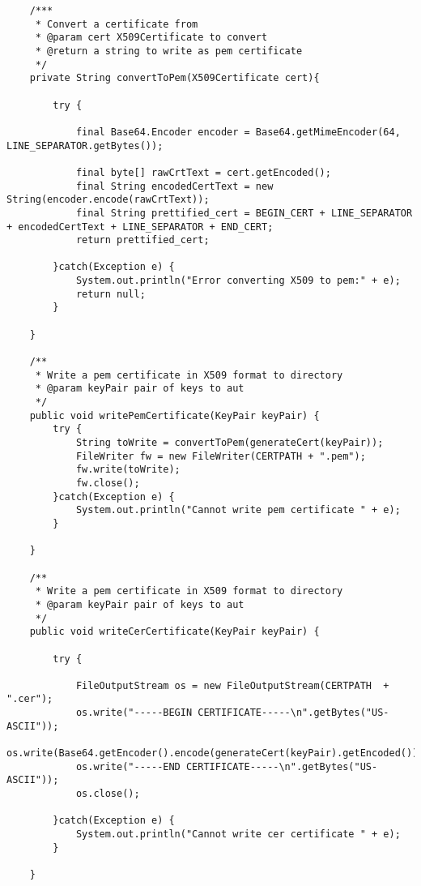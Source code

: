 \documentclass{article}
\begin{document}
\begin{verbatim}
	/***
	 * Convert a certificate from 
	 * @param cert X509Certificate to convert
	 * @return a string to write as pem certificate
	 */
	private String convertToPem(X509Certificate cert){

		try {

			final Base64.Encoder encoder = Base64.getMimeEncoder(64, LINE_SEPARATOR.getBytes());

			final byte[] rawCrtText = cert.getEncoded();
			final String encodedCertText = new String(encoder.encode(rawCrtText));
			final String prettified_cert = BEGIN_CERT + LINE_SEPARATOR + encodedCertText + LINE_SEPARATOR + END_CERT;
			return prettified_cert;
		
		}catch(Exception e) {
			System.out.println("Error converting X509 to pem:" + e);
			return null;
		}

	}

	/**
	 * Write a pem certificate in X509 format to directory
	 * @param keyPair pair of keys to aut
	 */
	public void writePemCertificate(KeyPair keyPair) {
		try {
			String toWrite = convertToPem(generateCert(keyPair));
			FileWriter fw = new FileWriter(CERTPATH + ".pem");
			fw.write(toWrite);
			fw.close();
		}catch(Exception e) {
			System.out.println("Cannot write pem certificate " + e);
		}
		
	}
	
	/**
	 * Write a pem certificate in X509 format to directory
	 * @param keyPair pair of keys to aut
	 */
	public void writeCerCertificate(KeyPair keyPair) {
		
		try {
		
			FileOutputStream os = new FileOutputStream(CERTPATH  + ".cer");
			os.write("-----BEGIN CERTIFICATE-----\n".getBytes("US-ASCII"));
			os.write(Base64.getEncoder().encode(generateCert(keyPair).getEncoded()));
			os.write("-----END CERTIFICATE-----\n".getBytes("US-ASCII"));
			os.close();
			
		}catch(Exception e) {
			System.out.println("Cannot write cer certificate " + e);
		}
		
	}
\end{verbatim}
\end{document}
